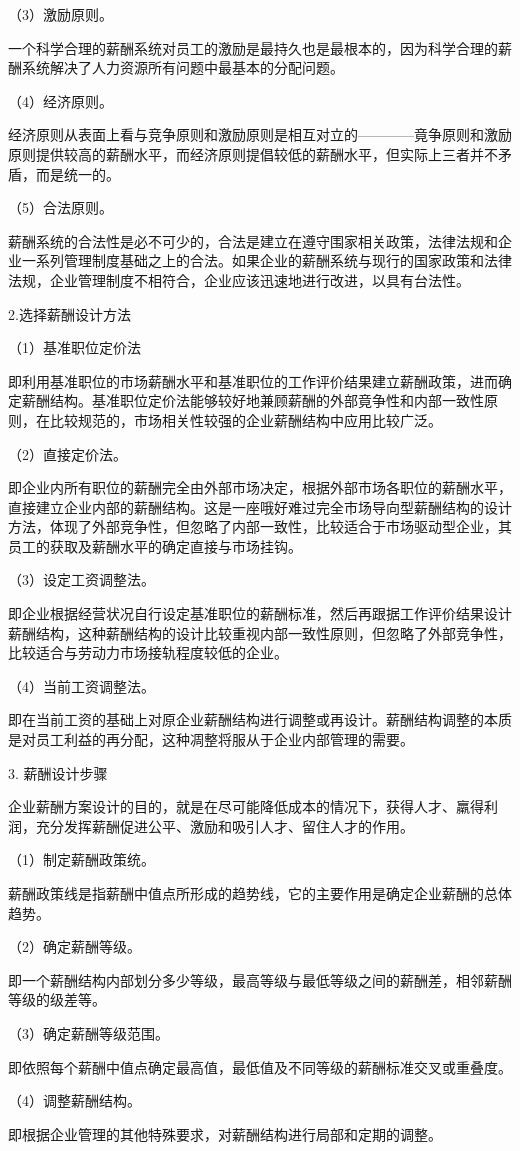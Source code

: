     （3）激励原则。

    一个科学合理的薪酬系统对员工的激励是最持久也是最根本的，因为科学合理的薪酬系统解决了人力资源所有问题中最基本的分配问题。

    （4）经济原则。

    经济原则从表面上看与竞争原则和激励原则是相互对立的————竟争原则和激励原则提供较高的薪酬水平，而经济原则提倡较低的薪酬水平，但实际上三者并不矛盾，而是统一的。

    （5）合法原则。

    薪酬系统的合法性是必不可少的，合法是建立在遵守围家相关政策，法律法规和企业一系列管理制度基础之上的合法。如果企业的薪酬系统与现行的国家政策和法律法规，企业管理制度不相符合，企业应该迅速地进行改进，以具有台法性。

    2.选择薪酬设计方法

    （1）基准职位定价法

    即利用基准职位的市场薪酬水平和基准职位的工作评价结果建立薪酬政策，进而确定薪酬结构。基准职位定价法能够较好地兼顾薪酬的外部竟争性和内部一致性原则，在比较规范的，市场相关性较强的企业薪酬结构中应用比较广泛。

    （2）直接定价法。

    即企业内所有职位的薪酬完全由外部市场决定，根据外部市场各职位的薪酬水平，直接建立企业内部的薪酬结构。这是一座哦好难过完全市场导向型薪酬结构的设计方法，体现了外部竞争性，但忽略了内部一致性，比较适合于市场驱动型企业，其员工的获取及薪酬水平的确定直接与市场挂钩。

    （3）设定工资调整法。

    即企业根据经营状况自行设定基准职位的薪酬标准，然后再跟据工作评价结果设计薪酬结构，这种薪酬结构的设计比较重视内部一致性原则，但忽略了外部竞争性，比较适合与劳动力市场接轨程度较低的企业。

    （4）当前工资调整法。

    即在当前工资的基础上对原企业薪酬结构进行调整或再设计。薪酬结构调整的本质是对员工利益的再分配，这种凋整将服从于企业内部管理的需要。

    3. 薪酬设计步骤

    企业薪酬方案设计的目的，就是在尽可能降低成本的情况下，获得人才、羸得利润，充分发挥薪酬促进公平、激励和吸引人才、留住人才的作用。

    （1）制定薪酬政策统。

    薪酬政策线是指薪酬中值点所形成的趋势线，它的主要作用是确定企业薪酬的总体趋势。

    （2）确定薪酬等级。

    即一个薪酬结构内部划分多少等级，最高等级与最低等级之间的薪酬差，相邻薪酬等级的级差等。

    （3）确定薪酬等级范围。

    即依照每个薪酬中值点确定最高值，最低值及不同等级的薪酬标准交叉或重叠度。

    （4）调整薪酬结构。

    即根据企业管理的其他特殊要求，对薪酬结构进行局部和定期的调整。

